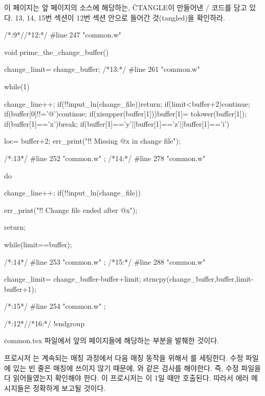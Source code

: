 {\tenpoint
\def\runninghead{\headlinefont 부록 A --- {\tt CTANGLE}의 변환 결과물 \CEE/ 코드}

이 페이지는 앞 페이지의 소스에 해당하는, \.{CTANGLE}이 만들어낸 \CEE/
코드를 담고 있다. 13, 14, 15번 섹션이 12번 섹션 안으로
들어간 것(tangled)을 확인하라.

\vskip10pt
\eightpoint
\verbatim
/*:9*//*12:*/
#line 247 "common.w"

void
prime_the_change_buffer()
{
change_limit= change_buffer;
/*13:*/
#line 261 "common.w"

while(1){
change_line++;
if(!!input_ln(change_file))return;
if(limit<buffer+2)continue;
if(buffer[0]!!='@')continue;
if(xisupper(buffer[1]))buffer[1]= tolower(buffer[1]);
if(buffer[1]=='x')break;
if(buffer[1]=='y'||buffer[1]=='z'||buffer[1]=='i'){
loc= buffer+2;
err_print("!! Missing @x in change file");

}
}

/*:13*/
#line 252 "common.w"
;
/*14:*/
#line 278 "common.w"

do{
change_line++;
if(!!input_ln(change_file)){
err_print("!! Change file ended after @x");

return;
}
}while(limit==buffer);

/*:14*/
#line 253 "common.w"
;
/*15:*/
#line 288 "common.w"

{
change_limit= change_buffer-buffer+limit;
strncpy(change_buffer,buffer,limit-buffer+1);
}

/*:15*/
#line 254 "common.w"
;
}

/*:12*//*16:*/
!endgroup
\vfill\eject

\tenpoint
\def\runninghead{\headlinefont 부록 A --- {\tt CWEAVE}의 변환 결과 \TEX/ 코드}

\.{common.tex} 파일에서 앞의 페이지들에 해당하는 부분을 발췌한 것이다.

\vskip8pt
\eightpoint
\verbatim
{}프로시저 는 계속되는 매칭 과정에서 다음 
매칭 동작을 위해서 를 세팅한다. 수정 파일에 있는 빈 줄은
매칭에 쓰이지 않기 때문에, 와 같은 검사를 해야한다. 즉, 수정 파일을 다 읽어들였는지 확인해야
한다. 이 프로시저는 이 1일 때만 호출된다. 따라서 에러
메시지들은 정확하게 보고될 것이다.

}
